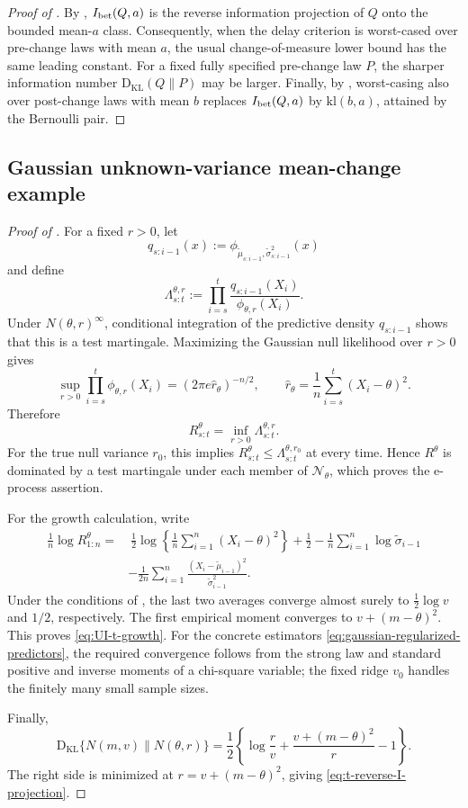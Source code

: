 \documentclass[12pt]{article}
\theoremstyle{spaced}
\theoremstyle{remark}
\newcommand{\KL}{\mathrm{D}_{\text{KL}}}
\newcommand{\kl}{\mathrm{kl}}
\begin{document}
\begin{proof}[Proof of ]
By , $I_{\rm bet}(Q,a)$ is the reverse information
projection of $Q$ onto the bounded mean-$a$ class.  Consequently, when the
delay criterion is worst-cased over pre-change laws with mean $a$, the
usual change-of-measure lower bound has the same leading constant.  For a
fixed fully specified pre-change law $P$, the sharper information number
$\KL(Q\|P)$ may be larger.  Finally, by
, worst-casing also over post-change laws with
mean $b$ replaces $I_{\rm bet}(Q,a)$ by $\kl(b,a)$, attained by the
Bernoulli pair.
\end{proof}



\subsection{Gaussian unknown-variance mean-change example}
\label{app:proof-gaussian}


\begin{proof}[Proof of ]
For a fixed $r>0$, let
\[
  q_{s:i-1}(x)
  :=\phi_{\widetilde\mu_{s:i-1},
           \widetilde\sigma^2_{s:i-1}}(x)
\]
and define
\[
  \Lambda_{s:t}^{\theta,r}
  :=\prod_{i=s}^t
  \frac{q_{s:i-1}(X_i)}{\phi_{\theta,r}(X_i)}.
\]
Under $N(\theta,r)^\infty$, conditional integration of the predictive density
$q_{s:i-1}$ shows that this is a test martingale.  Maximizing the Gaussian
null likelihood over $r>0$ gives
\[
  \sup_{r>0}\prod_{i=s}^t\phi_{\theta,r}(X_i)
  =(2\pi e\widehat r_\theta)^{-n/2},
  \qquad
  \widehat r_\theta
  =\frac1n\sum_{i=s}^t(X_i-\theta)^2.
\]
Therefore
\[
  R_{s:t}^{\theta}
  =\inf_{r>0}\Lambda_{s:t}^{\theta,r}.
\]
For the true null variance $r_0$, this implies
$R_{s:t}^{\theta}\le\Lambda_{s:t}^{\theta,r_0}$ at every time.  Hence
$R^\theta$ is dominated by a test martingale under each member of
$\mathcal N_\theta$, which proves the e-process assertion.

For the growth calculation, write
\begin{align*}
  \frac1n\log R_{1:n}^{\theta}
  =&\ \frac12\log\left\{
       \frac1n\sum_{i=1}^n(X_i-\theta)^2
     \right\}+\frac12
     -\frac1n\sum_{i=1}^n\log\widetilde\sigma_{i-1}\\
   &-\frac1{2n}\sum_{i=1}^n
       \frac{(X_i-\widetilde\mu_{i-1})^2}
            {\widetilde\sigma^2_{i-1}}.
\end{align*}
Under the conditions of \citet[Proposition~3.3]{wang2024anytime}, the last
two averages converge almost surely to
$\frac12\log v$ and $1/2$, respectively.  The first empirical moment
converges to $v+(m-\theta)^2$.  This proves
\eqref{eq:UI-t-growth}.  For the concrete estimators
\eqref{eq:gaussian-regularized-predictors}, the required convergence follows
from the strong law and standard positive and inverse moments of a chi-square
variable; the fixed ridge $v_0$ handles the finitely many small sample sizes.

Finally,
\[
  \KL\{N(m,v)\|N(\theta,r)\}
  =\frac12\left\{
    \log\frac rv+\frac{v+(m-\theta)^2}{r}-1
  \right\}.
\]
The right side is minimized at
$r=v+(m-\theta)^2$, giving
\eqref{eq:t-reverse-I-projection}.
\end{proof}
\end{document}
